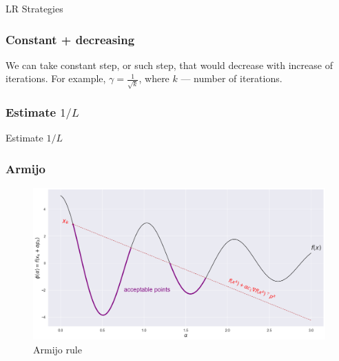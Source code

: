\documentclass[pdf,10pt]{beamer}
\begin{document}
\begin{section}{LR Strategies}

 \begin{frame}
   \frametitle{Constant + decreasing}

   We can take constant step, or such step, that would decrease with increase of iterations. For example, $\gamma = \frac{1}{\sqrt{k}}$, where $k$ --- number of iterations.
 \end{frame}


 \begin{frame}
   \frametitle{Estimate $1/L$}
   \begin{algorithm}[H]
     \caption{Estimate $1/L$}\label{algo:lr_est}
     \begin{algorithmic}[0]

       \State{$\alpha \gets \beta \cdot \alpha$ }
       \If{$\alpha < \epsilon$}
       \State{\Return{$\alpha$}}
       \EndIf{}
       \Else{}
       \State{\Return{$\alpha$}}
       \EndIf{}
       \EndFor{}
       \State{\Return{$\alpha$}}

     \end{algorithmic}
   \end{algorithm}
 \end{frame}


 \begin{frame}
   \frametitle{Armijo}
   \begin{figure}[hbt]
     \centering
     \includegraphics[width=\textwidth,keepaspectratio]{../data/armijo.png}
     \caption[Armijo rule]{Armijo rule}\label{fig:armijo}
   \end{figure}
 \end{frame}



\end{section}
\end{document}
